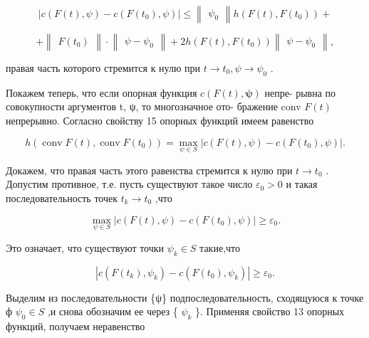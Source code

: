 \documentclass[8pt]{extarticle}
\begin{document}
\[
\left| {c\left( {F\left( t\right) ,\psi }\right)  - c\left( {F\left( {t}_{0}\right) ,\psi }\right) }\right|  \leq  \left\lVert \begin{array}{c} {\psi }_{0} \end{array} \right\rVert h\left( {F\left( t\right) ,F\left( {t}_{0}\right) }\right)  +
\]

\[
+ \left\lVert \begin{array}{c} {F\left( {t}_{0}\right) } \end{array} \right\rVert \cdot  \left\lVert \begin{array}{c} {\psi  - {\psi }_{0}} \end{array} \right\rVert + {2h}\left( {F\left( t\right) ,F\left( {t}_{0}\right) }\right) \left\lVert \begin{array}{c} {\psi  - {\psi }_{0}} \end{array} \right\rVert,
\]

правая часть которого стремится к нулю при \(t \rightarrow  {t}_{0},\psi  \rightarrow  {\psi }_{0}\) .

Покажем теперь, что если опорная функция \(c\left( {F\left( t\right) ,\mathbf{\psi }}\right)\) непре- рывна по совокупности аргументов t, ψ, то многозначное ото- бражение conv \(F\left( t\right)\) непрерывно. Согласно свойству 15 опорных функций имеем равенство

\[
h\left( {\operatorname{conv}F\left( t\right) ,\operatorname{conv}F\left( {t}_{0}\right) }\right)  = \mathop{\max }\limits_{{\psi  \in  S}}\left| {c\left( {F\left( t\right) ,\psi }\right)  - c\left( {F\left( {t}_{0}\right) ,\psi }\right) }\right| .
\]

Докажем, что правая часть этого равенства стремится к нулю при \(t \rightarrow  {t}_{0}\) . Допустим противное, т.е. пусть существуют такое число \({\varepsilon }_{0} > 0\) и такая последовательность точек \({t}_{k} \rightarrow  {t}_{0}\) ,что

\[
\mathop{\max }\limits_{{\psi  \in  S}}\left| {c\left( {F\left( t\right) ,\psi }\right)  - c\left( {F\left( {t}_{0}\right) ,\psi }\right) }\right|  \geq  {\varepsilon }_{0}.
\]

Это означает, что существуют точки \({\psi }_{k} \in  S\) такие,что

\[
\left| {c\left( {F\left( {t}_{k}\right) ,{\psi }_{k}}\right)  - c\left( {F\left( {t}_{0}\right) ,{\psi }_{k}}\right) }\right|  \geq  {\varepsilon }_{0}. \tag{4.4}
\]

Выделим из последовательности \{ψ\} подпоследовательность, сходящуюся к точке ф \({\psi }_{0} \in  S\) ,и снова обозначим ее через \{ \({\psi }_{k}\) \}. Применяя свойство 13 опорных функций, получаем неравенство
\end{document}
